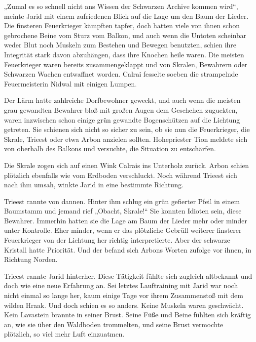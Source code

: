 „Zumal es so schnell nicht ans Wissen der Schwarzen Archive kommen wird“, meinte Jarid mit einem zufriedenen Blick auf die Lage um den Baum der Lieder. Die finsteren Feuerkrieger kämpften tapfer, doch hatten viele von ihnen schon gebrochene Beine vom Sturz vom Balkon, und auch wenn die Untoten scheinbar weder Blut noch Muskeln zum Bestehen und Bewegen benutzten, schien ihre Integrität stark davon abzuhängen, dass ihre Knochen heile waren. Die meisten Feuerkrieger waren bereits zusammengeklappt und von Skralen, Bewahrern oder Schwarzen Wachen entwaffnet worden. Calrai fesselte soeben die strampelnde Feuermeisterin Nidwal mit einigen Lumpen.

Der Lärm hatte zahlreiche Dorfbewohner geweckt, und auch wenn die meisten grau gewandten Bewahrer bloß mit großen Augen dem Geschehen zuguckten, waren inzwischen schon einige grün gewandte Bogenschützen auf die Lichtung getreten. Sie schienen sich nicht so sicher zu sein, ob sie nun die Feuerkrieger, die Skrale, Trieest oder etwa Arbon anzielen sollten. Hohepriester Tion meldete sich von oberhalb des Balkons und versuchte, die Situation zu entschärfen.

Die Skrale zogen sich auf einen Wink Calrais ins Unterholz zurück. Arbon schien plötzlich ebenfalls wie vom Erdboden verschluckt. Noch während Trieest sich nach ihm umsah, winkte Jarid in eine bestimmte Richtung.

Trieest rannte von dannen. Hinter ihm schlug ein grün gefierter Pfeil in einem Baumstamm und jemand rief „Obacht, Skrale!“ Sie konnten Idioten sein, diese Bewahrer. Immerhin hatten sie die Lage am Baum der Lieder mehr oder minder unter Kontrolle. Eher minder, wenn er das plötzliche Gebrüll weiterer finsterer Feuerkrieger von der Lichtung her richtig interpretierte. Aber der schwarze Kristall hatte Priorität. Und der befand sich Arbons Worten zufolge vor ihnen, in Richtung Norden.



\trennzeichen



Trieest rannte Jarid hinterher. Diese Tätigkeit fühlte sich zugleich altbekannt und doch wie eine neue Erfahrung an. Sei letztes Lauftraining mit Jarid war noch nicht einmal so lange her, kaum einige Tage vor ihrem Zusammenstoß mit dem wilden Hraak. Und doch schien es so anders. Keine Muskeln waren geschwächt. Kein Lavastein brannte in seiner Brust. Seine Füße und Beine fühlten sich kräftig an, wie sie über den Waldboden trommelten, und seine Brust vermochte plötzlich, so viel mehr Luft einzuatmen.

